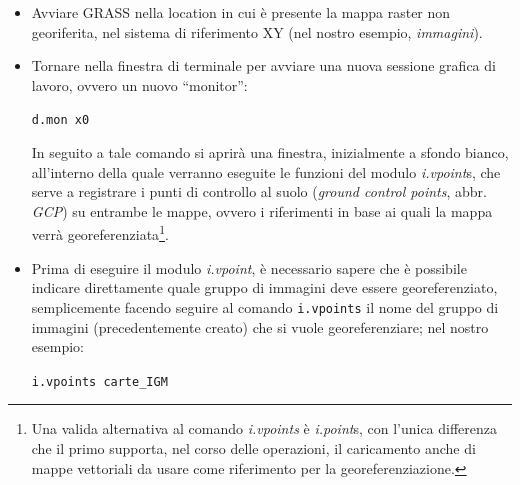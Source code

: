 		\begin{itemize}
			\item Avviare GRASS nella location in cui è presente la mappa raster non georiferita, nel sistema di riferimento XY (nel nostro esempio, \emph{immagini}).
			\item Tornare nella finestra di terminale per avviare una nuova sessione grafica di lavoro, ovvero un nuovo ``monitor'':

			\texttt{d.mon x0}

			In seguito a tale comando si aprirà una finestra, inizialmente a sfondo bianco, all'interno della quale verranno eseguite le funzioni del modulo \emph{i.vpoint}s, che serve a registrare i punti di controllo al suolo (\emph{ground control points}, abbr. \emph{GCP}) su entrambe le mappe, ovvero i riferimenti in base ai quali la mappa verrà georeferenziata\footnote{Una valida alternativa al comando \emph{i.vpoints} è \emph{i.point}s, con l'unica differenza che il primo supporta, nel corso delle operazioni, il caricamento anche di mappe vettoriali da usare come riferimento per la georeferenziazione.}.

			\item Prima di eseguire il modulo \emph{i.vpoint}, è necessario sapere che è possibile indicare direttamente quale gruppo di immagini deve essere georeferenziato, semplicemente facendo seguire al comando \texttt{i.vpoints} il nome del gruppo di immagini (precedentemente creato) che si vuole georeferenziare; nel nostro esempio:

			\texttt{i.vpoints carte\_IGM}

			\end{itemize}

			
			
